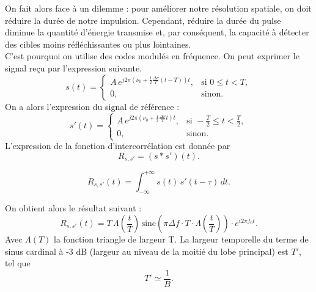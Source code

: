 \noindent On fait alors face à un dilemme : pour améliorer notre résolution spatiale, on doit réduire la durée de notre impulsion. Cependant, réduire la durée du pulse diminue la quantité d'énergie transmise et, par conséquent, la capacité à détecter des cibles moins réfléchissantes ou plus lointaines.\\
C'est pourquoi on utilise des codes modulés en fréquence. On peut exprimer le signal reçu par l'expression suivante.
\begin{equation}
s(t) =
\begin{cases}
A \, e^{j 2\pi \left(\nu_0 + \tfrac{1}{2} \tfrac{\Delta \nu}{T}(t - T)\right)t}, & \text{si } 0 \le t < T, \\[6pt]
0, & \text{sinon.}
\end{cases}
\end{equation}
On a alors l'expression du signal de référence :
\begin{equation}
\label{eq: signal_ref}
s'(t)=
\begin{cases}
A \, e^{j 2\pi \left(\nu_0 + \tfrac{1}{2} \tfrac{\Delta \nu}{T}t\right)t}, & \text{si } -\frac{T}{2} \le t < \frac{T}{2}, \\[6pt]
0, & \text{sinon.}
\end{cases}
\end{equation}
L'expression de la fonction d'intercorrélation est donnée par
\begin{equation}
    R_{s,s'} = (s \ast s')(t). 
\end{equation}

\[
R_{s,s'}(t) = \int_{-\infty}^{+\infty} s(t) \, s'(t-\tau) \, dt. 
\]

\noindent On obtient alors le résultat suivant :
\begin{equation}
    R_{s,s'}(t) = T \, \Lambda \!\left( \frac{t}{T} \right) \, \text{sinc} \!\left( \pi \Delta f \cdot T \cdot \Lambda \!\left( \frac{t}{T} \right) \right) \cdot e^{i 2 \pi f_0 t}. 
\end{equation}
\noindent Avec $\Lambda(T)$ la fonction triangle de largeur T. 
La largeur temporelle du terme de sinus cardinal à -3 dB (largeur au niveau de la moitié du lobe principal) est $T'$, tel que
\begin{equation}
    T' \simeq \frac{1}{B}. 
\end{equation}

